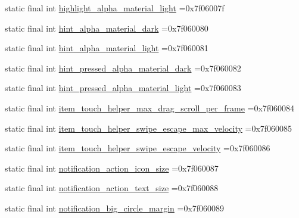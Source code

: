 \begin{DoxyCompactItemize}
\item 
static final int \mbox{\hyperlink{classbr_1_1unb_1_1cic_1_1mp_1_1marketmaster_1_1test_1_1R_1_1dimen_ab176afb050078626cfe51c3f136e7143}{highlight\+\_\+alpha\+\_\+material\+\_\+light}} =0x7f06007f
\item 
static final int \mbox{\hyperlink{classbr_1_1unb_1_1cic_1_1mp_1_1marketmaster_1_1test_1_1R_1_1dimen_aa65834eb984ed9705f33d95ad1d4aeec}{hint\+\_\+alpha\+\_\+material\+\_\+dark}} =0x7f060080
\item 
static final int \mbox{\hyperlink{classbr_1_1unb_1_1cic_1_1mp_1_1marketmaster_1_1test_1_1R_1_1dimen_adb9c6245efcac04fce922f82a5a09971}{hint\+\_\+alpha\+\_\+material\+\_\+light}} =0x7f060081
\item 
static final int \mbox{\hyperlink{classbr_1_1unb_1_1cic_1_1mp_1_1marketmaster_1_1test_1_1R_1_1dimen_a7857fdd33d5afb8b693507179de16755}{hint\+\_\+pressed\+\_\+alpha\+\_\+material\+\_\+dark}} =0x7f060082
\item 
static final int \mbox{\hyperlink{classbr_1_1unb_1_1cic_1_1mp_1_1marketmaster_1_1test_1_1R_1_1dimen_a8937900d6e4c42ab04f57d27a23c75b8}{hint\+\_\+pressed\+\_\+alpha\+\_\+material\+\_\+light}} =0x7f060083
\item 
static final int \mbox{\hyperlink{classbr_1_1unb_1_1cic_1_1mp_1_1marketmaster_1_1test_1_1R_1_1dimen_a872969fbbbffeb82083e45a63f7e2cd6}{item\+\_\+touch\+\_\+helper\+\_\+max\+\_\+drag\+\_\+scroll\+\_\+per\+\_\+frame}} =0x7f060084
\item 
static final int \mbox{\hyperlink{classbr_1_1unb_1_1cic_1_1mp_1_1marketmaster_1_1test_1_1R_1_1dimen_a4114e26b0e61323cf796ffa333fabf10}{item\+\_\+touch\+\_\+helper\+\_\+swipe\+\_\+escape\+\_\+max\+\_\+velocity}} =0x7f060085
\item 
static final int \mbox{\hyperlink{classbr_1_1unb_1_1cic_1_1mp_1_1marketmaster_1_1test_1_1R_1_1dimen_a6db41cfb4966c3ca8d202cc951729bbb}{item\+\_\+touch\+\_\+helper\+\_\+swipe\+\_\+escape\+\_\+velocity}} =0x7f060086
\item 
static final int \mbox{\hyperlink{classbr_1_1unb_1_1cic_1_1mp_1_1marketmaster_1_1test_1_1R_1_1dimen_a9c8a7b7d5fe2b0112f42e2736b00b5df}{notification\+\_\+action\+\_\+icon\+\_\+size}} =0x7f060087
\item 
static final int \mbox{\hyperlink{classbr_1_1unb_1_1cic_1_1mp_1_1marketmaster_1_1test_1_1R_1_1dimen_a357feef4e67ab58ecd440a2b6e960fc1}{notification\+\_\+action\+\_\+text\+\_\+size}} =0x7f060088
\item 
static final int \mbox{\hyperlink{classbr_1_1unb_1_1cic_1_1mp_1_1marketmaster_1_1test_1_1R_1_1dimen_a8a9f0f37542b86eb308312c8a3e2aed3}{notification\+\_\+big\+\_\+circle\+\_\+margin}} =0x7f060089

\end{DoxyCompactItemize}
